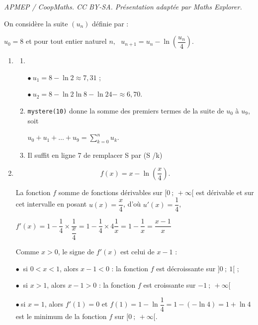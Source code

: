 \documentclass[10pt]{article}
\begin{document}
\noindent\textit{APMEP / CoopMaths. CC BY-SA. Présentation adaptée par Maths Explorer.}\par\medskip
\medskip

On considère la suite $\left(u_n\right)$ définie par : 

\begin{center} $u_0 = 8$ \:  et pour tout entier naturel \:\:$n,\:\:~u_{n+1} = u_n -\ln\left(\dfrac{u_n}{4}\right)$.\end{center}

\begin{enumerate}
\item 
	\begin{enumerate}
		\item ~
		
$\bullet~u_1 = 8 - \ln 2 \approx 7,31$ ;
		
$\bullet~u_2 = 8 - \ln 2  \ln {8 - \ln 2}{4}- \approx 6,70$.

		\item 












	

\texttt{mystere(10)} donne la somme des premiers termes de la suite de $u_0$ à $u_9$, soit 

$u_0 + u_1 + \ldots + u_9 = \displaystyle\sum_{k=0}^n u_k$.
		\item 
Il suffit en ligne 7 de remplacer S par (S /k)
	\end{enumerate}
\item 

\[ f(x) = x - \ln\left(\dfrac{x}{4}\right).\]













	

	

La fonction $f$ somme de fonctions dérivables sur $[0~;~+\infty[$ est dérivable et sur cet intervalle en posant $u(x) = \dfrac x4$, d'où $u'(x) = \dfrac14$,

$f'(x) = 1 - \dfrac14 \times \dfrac{1}{\dfrac x4} = 1 - \dfrac14 \times 4 \dfrac 1x  = 1 - \dfrac 1x  = \dfrac{x - 1}{x}$

Comme $x > 0$, le signe de $f'(x)$ est celui de $x - 1$ :

$\bullet~$ si $0< x < 1$, alors $x - 1 < 0$  : la fonction $f$ est décroissante sur $]0~;~1[$ ;

$\bullet~$ si $x > 1$, alors $x - 1 > 0$ : la fonction $f$ est croissante sur $-1~;~+ \infty[$

$\bullet~$si $x = 1$, alors $f'(1) = 0$ et $f(1) = 1 - \ln \dfrac14 = 1 - (-\ln 4) = 1 + \ln 4$ est le minimum de la fonction $f$ sur $[0~;~+ \infty[$.
\end{enumerate}
\end{document}
